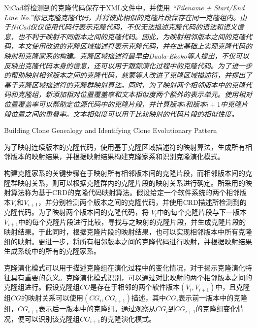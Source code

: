 
NiCad将检测到的克隆代码保存于XML文件中，并使用\em{ ``Filename + Start/End Line No.''}标记克隆克隆代码，并将彼此相似的克隆片段保存在同一克隆组内。由于NiCad仅仅使用代码行表示克隆代码，不仅无法描述克隆代码的语法和语义信息，也不利于映射不同版本之间的克隆代码。因此，为映射相邻版本之间的克隆代码，本文使用改进的克隆区域描述符表示克隆代码，并在此基础上实现克隆代码的映射和克隆家系的构建。克隆区域描述符最早由Duala-Ekoko等人提出，不仅可以反映出克隆代码本身的信息，还可以用于跟踪演化过程中的克隆代码\cite{duala2010clone}。为了进一步的帮助映射相邻版本之间的克隆代码，慈蒙等人改进了克隆区域描述符，并提出了基于克隆区域描述符的克隆群映射算法\cite{ci2013new}\cite{ci2013newD}。同时，为了映射两个相邻版本中的克隆代码和克隆组，新添加相对位置覆盖率和文本相似度两个额外的表示单元。使用相对位置覆盖率可以帮助定位源代码中的克隆片段，并计算版本$i$和版本$i+1$中克隆片段位置之间的重叠率。文本相似度可以用于比较映射的代码片段的相似性度。


{Building Clone Genealogy and Identifying Clone Evolutionary Pattern}

为了映射连续版本的克隆代码，使用基于克隆区域描述符的映射算法，生成所有相邻版本的映射结果，并根据映射结果构建克隆家系和识别克隆演化模式。

构建克隆家系的关键步骤在于映射所有相邻版本间的克隆片段，而相邻版本间的克隆群映射关系，则可以根据克隆群内的克隆片段的映射关系进行确定。所采用的映射算法称为基于CRD的克隆代码映射算法\cite{ci2013new}\cite{ci2013newD}。假设给定一个软件系统的两个相邻版本{$V_i$}和{$V_ {i + 1}$}，并分别检测两个版本之间的克隆代码，并使用CRD描述所检测到的克隆代码。为了映射两个版本间的克隆代码，将{ $V_i$}中的每个克隆片段与下一版本{$ V_{i+1}$}中的每个克隆片段进行比较，寻找与之映射的克隆片段，并生成克隆片段的映射结果。于此同时，根据克隆片段的映射结果，也可以实现相邻版本中所有克隆组的映射。更进一步，将所有相邻版本之间的克隆代码进行映射，并根据映射结果生成系统中的所有的克隆家系。

克隆演化模式可以用于描述克隆组在演化过程中的变化情况，对于揭示克隆演化特征具有重要的意义。克隆演化模式识别，可以通过对比映射的两个相邻版本之间的克隆组进行。假设克隆组$CG$是存在于相邻的两个软件版本{$(V_i,V_{i+1})$}中，且克隆组$CG$的映射关系可以使用{$(CG_i, CG_{i+1})$}描述，其中{$CG_i$}表示前一版本中的克隆组，{$CG_{i+1}$}表示后一版本中的克隆组。通过观察从{$CG_i$}到{$CG_{i+1}$}的克隆组变化情况，便可以识别该克隆组{$CG_{i+1}$}的克隆演化模式。



